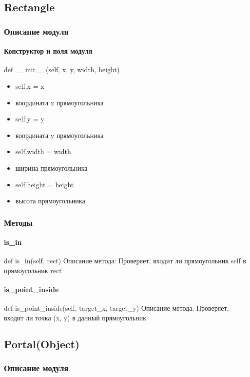 \subsection{Rectangle}
\subsubsection{Описание модуля}
\paragraph{Конструктор и поля модуля}
def \_\_init\_\_(self, x, y, width, height)
\begin{itemize}
	\item self.x = x
	\item координата x прямоугольника
	\item self.y = y
	\item координата y прямоугольника
	\item self.width = width
	\item ширина прямоугольника
	\item self.height = height
	\item высота прямоугольника
\end{itemize}
\subsubsection{Методы}
\paragraph{is\_in}
def is\_in(self, rect)
Описание метода: Проверяет, входит ли прямоугольник self в прямоугольник rect
\paragraph{is\_point\_inside}
def is\_point\_inside(self, target\_x, target\_y)
Описание метода: Проверяет, входит ли точка (x, y) в данный прямоугольник

\subsection{Portal(Object)}
\subsubsection{Описание модуля}
